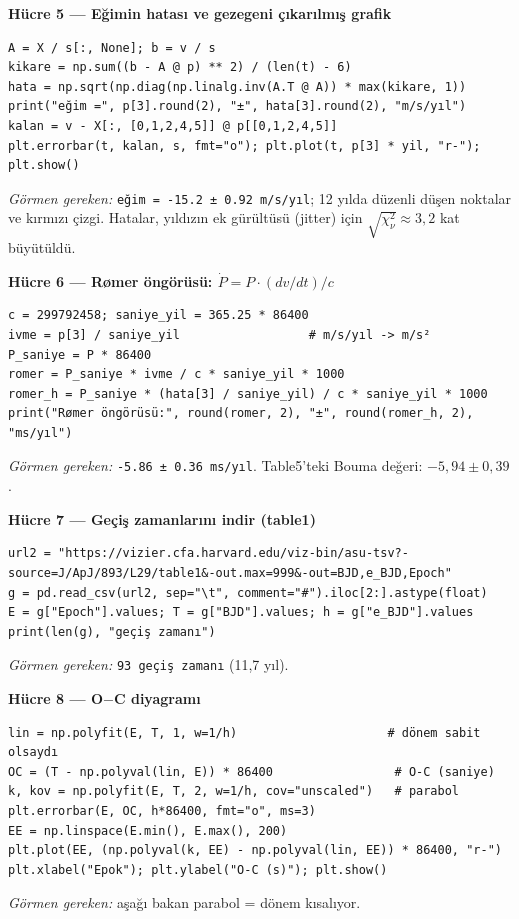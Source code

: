 \documentclass[11pt,a4paper]{article}
\begin{document}
\textbf{Hücre 5 — Eğimin hatası ve gezegeni çıkarılmış grafik}
\begin{lstlisting}
A = X / s[:, None]; b = v / s
kikare = np.sum((b - A @ p) ** 2) / (len(t) - 6)
hata = np.sqrt(np.diag(np.linalg.inv(A.T @ A)) * max(kikare, 1))
print("eğim =", p[3].round(2), "±", hata[3].round(2), "m/s/yıl")
kalan = v - X[:, [0,1,2,4,5]] @ p[[0,1,2,4,5]]
plt.errorbar(t, kalan, s, fmt="o"); plt.plot(t, p[3] * yil, "r-"); plt.show()
\end{lstlisting}
\emph{Görmen gereken:} \texttt{eğim = -15.2 ± 0.92 m/s/yıl}; 12 yılda düzenli düşen noktalar ve kırmızı çizgi. Hatalar, yıldızın ek gürültüsü (jitter) için $\sqrt{\chi^2_\nu}\approx3{,}2$ kat büyütüldü.

\textbf{Hücre 6 — Rømer öngörüsü: $\dot P = P\cdot(dv/dt)/c$}
\begin{lstlisting}
c = 299792458; saniye_yil = 365.25 * 86400
ivme = p[3] / saniye_yil                  # m/s/yıl -> m/s²
P_saniye = P * 86400
romer = P_saniye * ivme / c * saniye_yil * 1000
romer_h = P_saniye * (hata[3] / saniye_yil) / c * saniye_yil * 1000
print("Rømer öngörüsü:", round(romer, 2), "±", round(romer_h, 2), "ms/yıl")
\end{lstlisting}
\emph{Görmen gereken:} \texttt{-5.86 ± 0.36 ms/yıl}. Table5'teki Bouma değeri: $-5{,}94\pm0{,}39$.

\textbf{Hücre 7 — Geçiş zamanlarını indir (table1)}
\begin{lstlisting}
url2 = "https://vizier.cfa.harvard.edu/viz-bin/asu-tsv?-source=J/ApJ/893/L29/table1&-out.max=999&-out=BJD,e_BJD,Epoch"
g = pd.read_csv(url2, sep="\t", comment="#").iloc[2:].astype(float)
E = g["Epoch"].values; T = g["BJD"].values; h = g["e_BJD"].values
print(len(g), "geçiş zamanı")
\end{lstlisting}
\emph{Görmen gereken:} \texttt{93 geçiş zamanı} (11,7 yıl).

\textbf{Hücre 8 — O$-$C diyagramı}
\begin{lstlisting}
lin = np.polyfit(E, T, 1, w=1/h)                     # dönem sabit olsaydı
OC = (T - np.polyval(lin, E)) * 86400                 # O-C (saniye)
k, kov = np.polyfit(E, T, 2, w=1/h, cov="unscaled")   # parabol
plt.errorbar(E, OC, h*86400, fmt="o", ms=3)
EE = np.linspace(E.min(), E.max(), 200)
plt.plot(EE, (np.polyval(k, EE) - np.polyval(lin, EE)) * 86400, "r-")
plt.xlabel("Epok"); plt.ylabel("O-C (s)"); plt.show()
\end{lstlisting}
\emph{Görmen gereken:} aşağı bakan parabol = dönem kısalıyor.
\end{document}
